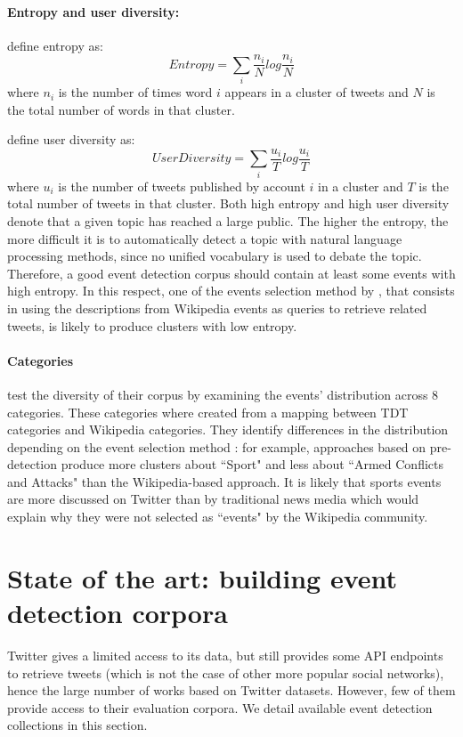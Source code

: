 		\paragraph{\textbf{Entropy and user diversity:}}
		\citet{petrovic_streaming_2010} define entropy as:
		$$
		Entropy = \sum_i\frac{n_i}{N}log\frac{n_i}{N}
		$$
		where $n_i$ is the number of times word $i$ appears in a cluster of tweets and $N$ is the total number of words in that cluster.
		
		\citet{kumar_tweets_2014} define user diversity as:
		$$
		UserDiversity = \sum_i\frac{u_i}{T}log\frac{u_i}{T}
		$$
		where $u_i$ is the number of tweets published by account $i$ in a cluster and $T$ is the total number of tweets in that cluster. Both high entropy and high user diversity denote that a given topic has reached a large public. The higher the entropy, the more difficult it is to automatically detect a topic with natural language processing methods, since no unified vocabulary is used to debate the topic. Therefore, a good event detection corpus should contain at least some events with high entropy. In this respect, one of the events selection method by \citet{mcminn_building_2013}, that consists in using the descriptions from Wikipedia events as queries to retrieve related tweets, is likely to produce clusters with low entropy. 
		
		\paragraph{\textbf{Categories}}
		\citet{mcminn_building_2013} test the diversity of their corpus by examining the events' distribution across 8 categories. These categories where created from a mapping between TDT categories \citep{allan_introduction_2002} and Wikipedia categories. They identify differences in the distribution depending on the event selection method : for example, approaches based on pre-detection produce more clusters about ``Sport" and less about ``Armed Conflicts and Attacks" than the Wikipedia-based approach. It is likely that sports events are more discussed on Twitter than by traditional news media which would explain why they were not selected as ``events" by the Wikipedia community.


\section{State of the art: building event detection corpora}

Twitter gives a limited access to its data, but still provides some API endpoints to retrieve tweets (which is not the case of other more popular social networks), hence the large number of works based on Twitter datasets. However, few of them provide access to their evaluation corpora. We detail available event detection collections in this section.

